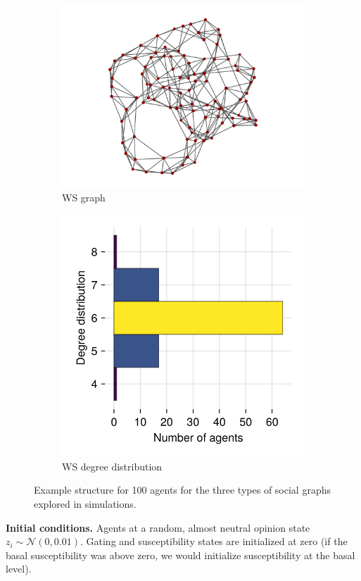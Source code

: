 \documentclass[]{article}
\begin{document}
\begin{figure}
	\begin{subfigure}{0.45\textwidth}
		\centering
		\includegraphics[width=0.8\linewidth]{../plots/g_wattsstrogatz_n100_k3_p01_s33} 
		\caption{WS graph}  \label{fig:subim31}
	\end{subfigure}
	\hspace{-1cm}
	\begin{subfigure}{0.45\textwidth}
		\centering
		\includegraphics[width=0.5\linewidth]{../plots/g_wattsstrogatz_hist_degree_n100_k3_p01_s33}
		\caption{WS degree distribution} \label{fig:subim32}
	\end{subfigure}
	
	\caption{Example structure for 100 agents for the three types of social graphs explored in simulations.}
	\label{fig:graphtypes}
\end{figure}

\textbf{Initial conditions.} Agents at a random, almost neutral opinion state $z_i \sim \mathcal{N}(0, 0.01)$. Gating and susceptibility states are initialized at zero (if the basal susceptibility was above zero, we would initialize susceptibility at the basal level).
\end{document}
